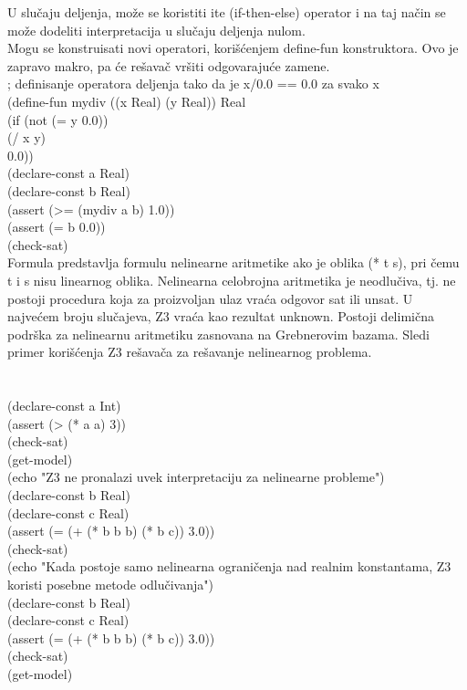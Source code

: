 \documentclass[12pt,oneside]{memoir}
\begin{document}
U slučaju deljenja, može se koristiti ite (if-then-else) operator i na taj način se može dodeliti interpretacija u slučaju deljenja nulom.
\\
Mogu se konstruisati novi operatori, korišćenjem define-fun konstruktora. Ovo je zapravo makro, pa će rešavač vršiti odgovarajuće zamene.
\\; definisanje operatora deljenja tako da je  x/0.0 == 0.0 za svako x
\\(define-fun mydiv ((x Real) (y Real)) Real
\\  (if (not (= y 0.0))
\\      (/ x y)
\\      0.0))
\\(declare-const a Real)
\\(declare-const b Real)
\\(assert (>= (mydiv a b) 1.0))
\\(assert (= b 0.0))
\\(check-sat)
\\
Formula predstavlja formulu nelinearne aritmetike ako je oblika (* t s), pri čemu t i s nisu linearnog oblika.
Nelinearna celobrojna aritmetika je neodlučiva, tj. ne postoji procedura koja za proizvoljan ulaz vraća odgovor sat ili unsat. U najvećem broju slučajeva, Z3 vraća kao rezultat unknown. 
Postoji delimična podrška za nelinearnu aritmetiku zasnovana na Grebnerovim bazama.
Sledi primer korišćenja Z3 rešavača za rešavanje nelinearnog problema.
\\ 
\\
\\(declare-const a Int)
\\(assert (> (* a a) 3))
\\(check-sat)
\\(get-model)
\\(echo "Z3 ne pronalazi uvek interpretaciju za nelinearne probleme")
\\(declare-const b Real)
\\(declare-const c Real)
\\(assert (= (+ (* b b b) (* b c)) 3.0))
\\(check-sat)
\\(echo "Kada postoje samo nelinearna ograničenja nad realnim konstantama, Z3 koristi posebne metode odlučivanja")
\\(declare-const b Real)
\\(declare-const c Real)
\\(assert (= (+ (* b b b) (* b c)) 3.0))
\\(check-sat)
\\(get-model)
\end{document}
